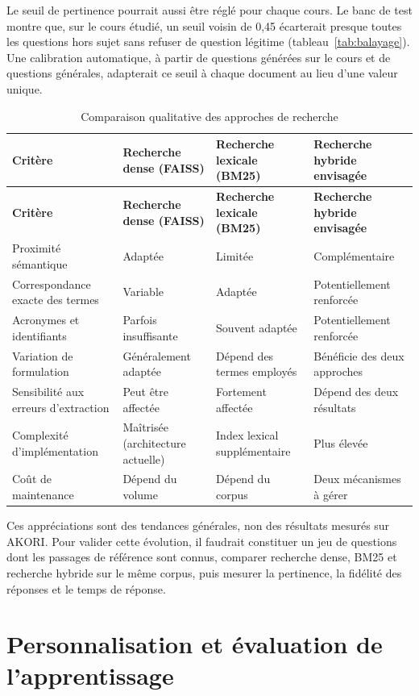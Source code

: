 \documentclass[12pt,a4paper,oneside]{report}
\begin{document}
Le seuil de pertinence pourrait aussi être réglé pour chaque cours. Le banc de test montre que, sur le cours étudié, un seuil voisin de 0,45 écarterait presque toutes les questions hors sujet sans refuser de question légitime (tableau~\ref{tab:balayage}). Une calibration automatique, à partir de questions générées sur le cours et de questions générales, adapterait ce seuil à chaque document au lieu d'une valeur unique.

\begin{longtable}{p{}|p{}|p{}|p{}}
\caption{Comparaison qualitative des approches de recherche}\label{tab:hybride}\\
\hline
\textbf{Critère} & \textbf{Recherche dense (FAISS)} & \textbf{Recherche lexicale (BM25)} & \textbf{Recherche hybride envisagée} \\ \hline
\endfirsthead
\hline
\textbf{Critère} & \textbf{Recherche dense (FAISS)} & \textbf{Recherche lexicale (BM25)} & \textbf{Recherche hybride envisagée} \\ \hline
\endhead
Proximité sémantique & Adaptée & Limitée & Complémentaire \\ \hline
Correspondance exacte des termes & Variable & Adaptée & Potentiellement renforcée \\ \hline
Acronymes et identifiants & Parfois insuffisante & Souvent adaptée & Potentiellement renforcée \\ \hline
Variation de formulation & Généralement adaptée & Dépend des termes employés & Bénéficie des deux approches \\ \hline
Sensibilité aux erreurs d'extraction & Peut être affectée & Fortement affectée & Dépend des deux résultats \\ \hline
Complexité d'implémentation & Maîtrisée (architecture actuelle) & Index lexical supplémentaire & Plus élevée \\ \hline
Coût de maintenance & Dépend du volume & Dépend du corpus & Deux mécanismes à gérer \\ \hline
\end{longtable}

Ces appréciations sont des tendances générales, non des résultats mesurés sur AKORI. Pour valider cette évolution, il faudrait constituer un jeu de questions dont les passages de référence sont connus, comparer recherche dense, BM25 et recherche hybride sur le même corpus, puis mesurer la pertinence, la fidélité des réponses et le temps de réponse.

\section{Personnalisation et évaluation de l'apprentissage}
\end{document}

